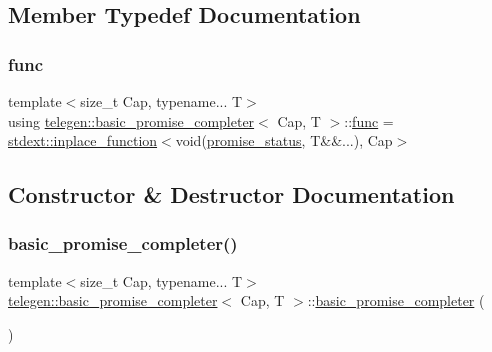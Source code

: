 \subsection{Member Typedef Documentation}
\mbox{\label{classtelegen_1_1basic__promise__completer_a0f689589e2a64063b01ea7a4268e8cfe}} 
\subsubsection{\texorpdfstring{func}{func}}
{\footnotesize\ttfamily template$<$size\+\_\+t Cap, typename... T$>$ \\
using \hyperlink{classtelegen_1_1basic__promise__completer}{telegen\+::basic\+\_\+promise\+\_\+completer}$<$ Cap, T $>$\+::\hyperlink{classtelegen_1_1basic__promise__completer_a0f689589e2a64063b01ea7a4268e8cfe}{func} =  \hyperlink{classstdext_1_1inplace__function}{stdext\+::inplace\+\_\+function}$<$void(\hyperlink{namespacetelegen_a51e8b7480c7247182e2c6ca35e2c7504}{promise\+\_\+status}, T\&\&...), Cap$>$}



\subsection{Constructor \& Destructor Documentation}
\mbox{\label{classtelegen_1_1basic__promise__completer_a077149a13f4eef6d4201b972d158e5c8}} 
\subsubsection{\texorpdfstring{basic\+\_\+promise\+\_\+completer()}{basic\_promise\_completer()}\hspace{0.1cm}{\footnotesize\ttfamily [1/3]}}
{\footnotesize\ttfamily template$<$size\+\_\+t Cap, typename... T$>$ \\
\hyperlink{classtelegen_1_1basic__promise__completer}{telegen\+::basic\+\_\+promise\+\_\+completer}$<$ Cap, T $>$\+::\hyperlink{classtelegen_1_1basic__promise__completer}{basic\+\_\+promise\+\_\+completer} (\begin{DoxyParamCaption}{ }\end{DoxyParamCaption})\hspace{0.3cm}{\ttfamily [inline]}}

